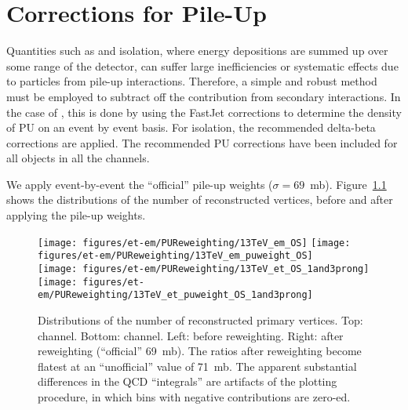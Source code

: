 \chapter{Corrections for Pile-Up}

Quantities such as \MET and isolation, where energy depositions are
summed up over some range of the detector, can suffer large
inefficiencies or systematic effects due to particles from pile-up
interactions. Therefore, a simple and robust method must be employed
to subtract off the contribution from secondary interactions.  In the
case of \MET, this is done by using the FastJet corrections to
determine the density of PU on an event by event basis. For isolation, the 
recommended delta-beta corrections are applied. The
recommended PU corrections have been included for all objects in all
the channels.




We apply event-by-event the ``official'' pile-up weights
($\sigma=69$~mb).  Figure~\ref{fig:nvtx} shows the distributions of
the number of reconstructed vertices, before and after applying the
pile-up weights.

\begin{figure}
  \centering
  \texttt{[image: figures/et-em/PUReweighting/13TeV\_em\_OS]}
  \texttt{[image: figures/et-em/PUReweighting/13TeV\_em\_puweight\_OS]} \\
  \texttt{[image: figures/et-em/PUReweighting/13TeV\_et\_OS\_1and3prong]}
  \texttt{[image: figures/et-em/PUReweighting/13TeV\_et\_puweight\_OS\_1and3prong]} \\
  \caption{\label{fig:nvtx} Distributions of the number of
    reconstructed primary vertices.  Top: \emu channel.  Bottom: \etau
    channel.  Left: before reweighting.  Right: after reweighting
    (``official'' 69~mb).  The ratios after reweighting become flatest
    at an ``unofficial'' value of 71~mb.  The apparent substantial
    differences in the QCD ``integrals'' are artifacts of the plotting
    procedure, in which bins with negative contributions are zero-ed.}
\end{figure}
